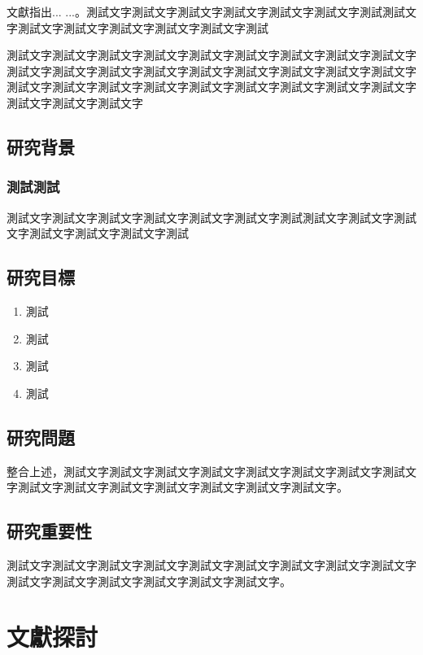 \documentclass[12pt,a4paper,oneside]{book}
\begin{document}
文獻\cite{test2021}指出... ...。測試文字測試文字測試文字測試文字測試文字測試文字測試測試文字測試文字測試文字測試文字測試文字測試文字測試

測試文字測試文字測試文字測試文字測試文字測試文字測試文字測試文字測試文字測試文字測試文字測試文字測試文字測試文字測試文字測試文字測試文字測試文字測試文字測試文字測試文字測試文字測試文字測試文字測試文字測試文字測試文字測試文字測試文字測試文字

\section{研究背景}
\subsection{測試測試}

測試文字測試文字測試文字測試文字測試文字測試文字測試測試文字測試文字測試文字測試文字測試文字測試文字測試

\section{研究目標}

\begin{enumerate}
\item 測試 
\item 測試 
\item 測試
\item 測試
\end{enumerate}

\section{研究問題}
整合上述，測試文字測試文字測試文字測試文字測試文字測試文字測試文字測試文字測試文字測試文字測試文字測試文字測試文字測試文字測試文字。

\section{研究重要性} 

測試文字測試文字測試文字測試文字測試文字測試文字測試文字測試文字測試文字測試文字測試文字測試文字測試文字測試文字測試文字。


\chapter{文獻探討}
\label{c:related}
\end{document}
